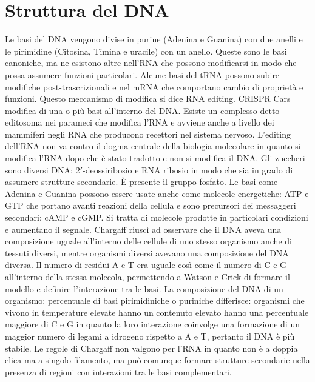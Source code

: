 \section{Struttura del DNA}
Le basi del DNA vengono divise in purine (Adenina e Guanina) con due anelli e le pirimidine (Citosina, Timina e uracile) con un anello. Queste sono le basi canoniche, ma ne esistono
altre nell'RNA che possono modificarsi in modo che possa assumere funzioni particolari. Alcune basi del tRNA possono subire modifiche post-trascrizionali e nel mRNA che comportano cambio
di propriet\`a e funzioni. Questo meccanismo di modifica si dice RNA editing. CRISPR Cars modifica di una o pi\`u basi all'interno del DNA. Esiste un complesso detto editosoma nei 
parameci che modifica l'RNA e avviene anche a livello dei mammiferi negli RNA che producono recettori nel sistema nervoso. L'editing dell'RNA non va contro il dogma centrale della
biologia molecolare in quanto si modifica l'RNA dopo che \`e stato tradotto e non si modifica il DNA. Gli zuccheri sono diversi DNA: $2'$-deossiribosio e RNA ribosio in modo che sia in 
grado di assumere strutture secondarie. \`E presente il gruppo fosfato. Le basi come Adenina e Guanina possono essere usate anche come molecole energetiche: ATP e GTP che portano avanti
reazioni della cellula e sono precursori dei messaggeri secondari: cAMP e cGMP. Si tratta di molecole prodotte in particolari condizioni e aumentano il segnale. Chargaff riusc\`i ad 
osservare che il DNA aveva una composizione uguale all'interno delle cellule di uno stesso organismo anche di tessuti diversi, mentre organismi diversi avevano una composizione del DNA
diversa. Il numero di residui A e T era uguale cos\`i come il numero di C e G all'interno della stessa molecola, permettendo a Watson e Crick di formare il modello e definire
l'interazione tra le basi. La composizione del DNA di un organismo: percentuale di basi pirimidiniche o puriniche differisce: organismi che vivono in temperature elevate hanno un 
contenuto elevato hanno una percentuale maggiore di C e G in quanto la loro interazione coinvolge una formazione di un maggior numero di legami a idrogeno rispetto a A e T, pertanto il 
DNA \`e pi\`u stabile. Le regole di Chargaff non valgono per l'RNA in quanto non \`e a doppia elica ma a singolo filamento, ma pu\`o comunque formare strutture secondarie nella presenza
di regioni con interazioni tra le basi complementari. 
